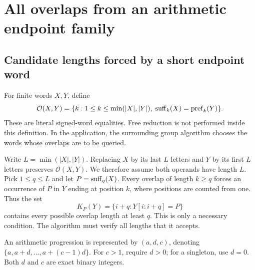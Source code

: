\section{All overlaps from an arithmetic endpoint family}
\label{sec:overlaps}

\subsection{Candidate lengths forced by a short endpoint word}

For finite words $X,Y$, define
\[
 \mathcal O(X,Y)=\{k:1\leq k\leq\min(|X|,|Y|),\;
                    \operatorname{suff}_k(X)=\operatorname{pref}_k(Y)\}.
\]
These are literal signed-word equalities. Free reduction is not performed
inside this definition. In the application, the surrounding group algorithm
chooses the words whose overlaps are to be queried.

Write $L=\min(|X|,|Y|)$. Replacing $X$ by its last $L$ letters and $Y$ by
its first $L$ letters preserves $\mathcal O(X,Y)$. We therefore assume both
operands have length $L$. Pick $1\leq q\leq L$ and let
$P=\operatorname{suff}_q(X)$. Every overlap of length $k\geq q$ forces an occurrence of
$P$ in $Y$ ending at position $k$, where positions are counted from one.
Thus the set
\[
 K_P(Y)=\{i+q:Y[i:i+q]=P\}
\]
contains every possible overlap length at least $q$. This is only a necessary
condition. The algorithm must verify all lengths that it accepts.

An arithmetic progression is represented by $(a,d,c)$, denoting
$\{a,a+d,\ldots,a+(c-1)d\}$. For $c>1$, require $d>0$;
for a singleton, use $d=0$. Both $d$ and $c$ are exact binary integers.

